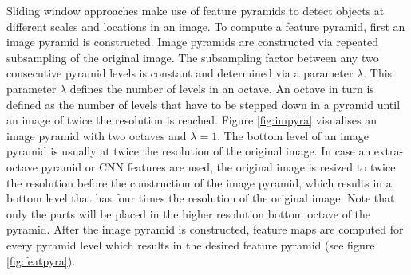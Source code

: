 Sliding window approaches make use of feature pyramids to detect objects at different scales and locations in an image. To compute a  feature pyramid, first an image pyramid is constructed. Image pyramids are constructed via repeated subsampling of the original image. The subsampling factor between any two consecutive pyramid levels is constant and determined via a parameter $\lambda$. This parameter $\lambda$ defines the number of levels in an octave. An octave in turn is defined as the number of levels that have to be stepped down in a pyramid until an image of twice the resolution is reached. Figure \ref{fig:impyra} visualises an image pyramid with two octaves and $\lambda=1$. The bottom level of an image pyramid is usually at twice the resolution of the original image. In case an extra-octave pyramid or CNN features are used, the original image is resized to twice the resolution before the construction of the image pyramid, which results in a bottom level that has four times the resolution of the original image. Note that only the parts will be placed in the higher resolution bottom octave of the pyramid. After the image pyramid is constructed, feature maps are computed for every pyramid level which results in the desired feature pyramid (see figure \ref{fig:featpyra}).